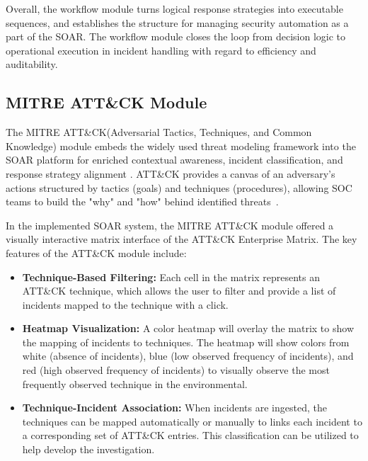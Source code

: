 Overall, the workflow module turns logical response strategies into executable sequences, and establishes the structure for managing security automation as a part of the SOAR. The workflow module closes the loop from decision logic to operational execution in incident handling with regard to efficiency and auditability.

\subsection{MITRE ATT\&CK Module}

The MITRE ATT\&CK(Adversarial Tactics, Techniques, and Common Knowledge) module embeds the widely used threat modeling framework into the SOAR platform for enriched contextual awareness, incident classification, and response strategy alignment . ATT\&CK provides a canvas of an adversary's actions structured by tactics (goals) and techniques (procedures), allowing SOC teams to build the "why" and "how" behind identified threats~\cite{mitre}.

In the implemented SOAR system, the MITRE ATT\&CK module offered a visually interactive matrix interface of the ATT\&CK Enterprise Matrix. The key features of the ATT\&CK module include:

\begin{itemize}
    \item \textbf{Technique-Based Filtering:} Each cell in the matrix represents an ATT\&CK technique, which allows the user to filter and provide a list of incidents mapped to the technique with a click.
    
    \item \textbf{Heatmap Visualization:} A color heatmap will overlay the matrix to show the mapping of incidents to techniques. The heatmap will show colors from white (absence of incidents), blue (low observed frequency of incidents), and red (high observed frequency of incidents) to visually observe the most frequently observed technique in the environmental.
    
    \item \textbf{Technique-Incident Association:} When incidents are ingested, the techniques can be mapped automatically or manually to links each incident to a corresponding set of ATT\&CK entries. This classification can be utilized to help develop the investigation.
\end{itemize}

